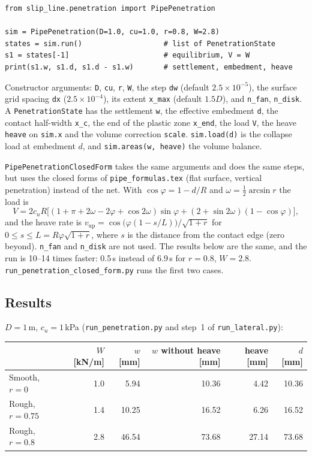 \documentclass[11pt,a4paper]{article}
\begin{document}
\begin{lstlisting}
from slip_line.penetration import PipePenetration

sim = PipePenetration(D=1.0, cu=1.0, r=0.8, W=2.8)
states = sim.run()                   # list of PenetrationState
s1 = states[-1]                      # equilibrium, V = W
print(s1.w, s1.d, s1.d - s1.w)       # settlement, embedment, heave
\end{lstlisting}

Constructor arguments: \texttt{D}, \texttt{cu}, \texttt{r}, \texttt{W},
the step \texttt{dw} (default $2.5\times10^{-5}$), the surface grid
spacing \texttt{dx} ($2.5\times10^{-4}$), its extent \texttt{x\_max}
(default $1.5D$), and \texttt{n\_fan}, \texttt{n\_disk}.
A \texttt{PenetrationState} has the settlement \texttt{w}, the effective
embedment \texttt{d}, the contact half-width \texttt{x\_c}, the end of
the plastic zone \texttt{x\_end}, the load \texttt{V}, the heave
\texttt{heave} on \texttt{sim.x} and the volume correction
\texttt{scale}.  \texttt{sim.load(d)} is the collapse load at
embedment $d$, and \texttt{sim.areas(w, heave)} the volume balance.

\texttt{PipePenetrationClosedForm} takes the same arguments and does the
same steps, but uses the closed forms of \texttt{pipe\_formulas.tex}
(flat surface, vertical penetration) instead of the net.  With
$\cos\varphi = 1 - d/R$ and $\omega = \tfrac12\arcsin r$ the load is
\[
  V = 2c_uR\bigl[(1 + \pi + 2\omega - 2\varphi + \cos 2\omega)\sin\varphi
      + (2 + \sin 2\omega)(1 - \cos\varphi)\bigr] ,
\]
and the heave rate is $v_\text{up} = \cos\bigl(\varphi(1 - s/L)\bigr)/\sqrt{1 + r}$
for $0 \le s \le L = R\varphi\sqrt{1 + r}$, where $s$ is the distance
from the contact edge (zero beyond).  \texttt{n\_fan} and
\texttt{n\_disk} are not used.  The results below are the same, and the
run is 10--14 times faster: 0.5\,s instead of 6.9\,s for $r = 0.8$,
$W = 2.8$.  \texttt{run\_penetration\_closed\_form.py} runs the first
two cases.

\subsection{Results}

$D = 1$\,m, $c_u = 1$\,kPa (\texttt{run\_penetration.py} and step~1 of
\texttt{run\_lateral.py}):

\begin{center}
\begin{tabular}{lrrrrr}
\toprule
 & $W$ [kN/m] & $w$ [mm] & $w$ without heave [mm] & heave [mm] & $d$ [mm] \\
\midrule
Smooth, $r = 0$  & 1.0 & 5.94  & 10.36 & 4.42  & 10.36 \\
Rough, $r = 0.75$ & 1.4 & 10.25 & 16.52 & 6.26  & 16.52 \\
Rough, $r = 0.8$  & 2.8 & 46.54 & 73.68 & 27.14 & 73.68 \\
\bottomrule
\end{tabular}
\end{center}
\end{document}
